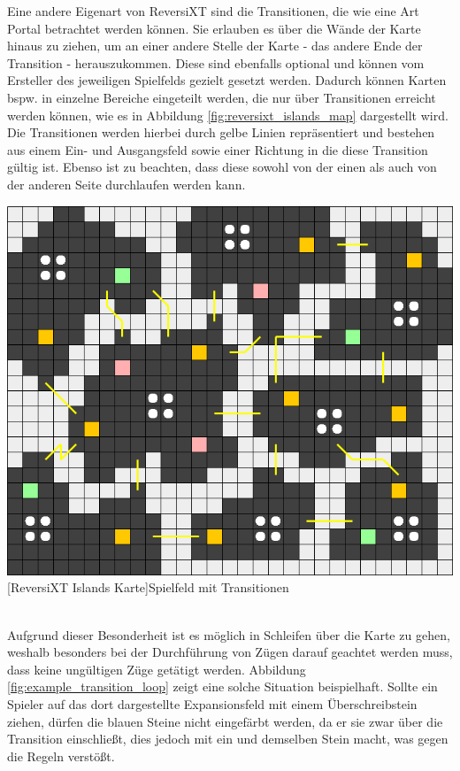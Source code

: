 \documentclass[12pt,a4paper,bibliography=totocnumbered,listof=totocnumbered]{article}
\begin{document}
Eine andere Eigenart von ReversiXT sind die Transitionen, die wie eine Art Portal betrachtet werden können. Sie erlauben es über die Wände der Karte hinaus zu ziehen, um an einer andere Stelle der Karte - das andere Ende der Transition - herauszukommen. Diese sind ebenfalls optional und können vom Ersteller des jeweiligen Spielfelds gezielt gesetzt werden. Dadurch können Karten bspw. in einzelne Bereiche eingeteilt werden, die nur über Transitionen erreicht werden können, wie es in Abbildung \ref{fig:reversixt_islands_map} dargestellt wird. Die Transitionen werden hierbei durch gelbe Linien repräsentiert und bestehen aus einem Ein- und Ausgangsfeld sowie einer Richtung in die diese Transition gültig ist. Ebenso ist zu beachten, dass diese sowohl von der einen als auch von der anderen Seite durchlaufen werden kann.

\vspace{1em}
\begin{minipage}{\linewidth}
	\centering
	\includegraphics[width=0.7\linewidth]{pics/reversixt_islands_map.png}
	[ReversiXT Islands Karte]{Spielfeld mit Transitionen}
	\label{fig:reversixt_islands_map}
\end{minipage}
\\

Aufgrund dieser Besonderheit ist es möglich in Schleifen über die Karte zu gehen, weshalb besonders bei der Durchführung von Zügen darauf geachtet werden muss, dass keine ungültigen Züge getätigt werden. Abbildung \ref{fig:example_transition_loop} zeigt eine solche Situation beispielhaft. Sollte ein Spieler auf das dort dargestellte Expansionsfeld mit einem Überschreibstein ziehen, dürfen die blauen Steine nicht eingefärbt werden, da er sie zwar über die Transition einschließt, dies jedoch mit ein und demselben Stein macht, was gegen die Regeln verstößt.
\end{document}
